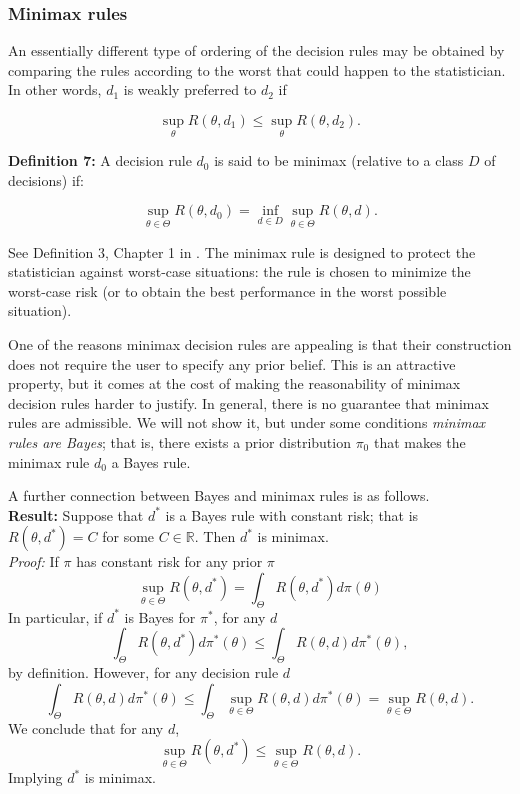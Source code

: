 \documentclass[11pt]{article} %
\begin{document}
\subsubsection{Minimax rules} 

An essentially different type of ordering of the decision rules may be obtained by comparing the rules according to the worst that could happen to the statistician. In other words, $d_1$ is weakly preferred to $d_2$ if

\[ \sup_{\theta} R(\theta, d_1) \leq \sup_{\theta} R(\theta, d_2). \]

\noindent \textbf{Definition 7:} A decision rule $d_0$ is said to be minimax (relative to a class $D$ of decisions) if:

\[ \sup_{\theta \in \Theta} R(\theta, d_0) = \inf_{d \in D} \sup_{\theta \in \Theta} R(\theta, d). \] 

See Definition 3, Chapter 1 in \cite{Ferguson67}. The minimax rule is designed to protect the statistician against worst-case situations: the rule is chosen to minimize the worst-case risk (or to obtain the best performance in the worst possible situation). 

One of the reasons minimax decision rules are appealing is that their construction does not require the user to specify any prior belief. This is an attractive property, but it comes at the cost of making the reasonability of minimax decision rules harder to justify. In general, there is no guarantee that minimax rules are admissible. We will not show it, but under some conditions \emph{minimax rules are Bayes}; that is, there exists a prior distribution $\pi_0$ that makes the minimax rule $d_0$ a Bayes rule. 

A further connection between Bayes and minimax rules is as follows. \\

\noindent \textbf{Result:} Suppose that $d^*$ is a Bayes rule with constant risk; that is $R(\theta, d^*)= C$ for some $C \in \mathbb{R}$. Then $d^*$ is minimax. \\

\noindent \emph{Proof:} If $\pi$ has constant risk for any prior $\pi$
\[ \sup_{\theta \in \Theta} R(\theta, d^*) = \int_{\Theta} R(\theta, d^*) d \pi(\theta)   \]
 In particular, if $d^*$ is Bayes for $\pi^*$, for any $d$
 \[  \int_{\Theta} R(\theta, d^*) d \pi^*(\theta) \leq \int_{\Theta} R(\theta, d) d \pi^*(\theta),    \]
by definition. However, for any decision rule $d$
 \[  \int_{\Theta} R(\theta, d) d \pi^*(\theta) \leq \int_{\Theta} \sup_{\theta \in \Theta} R(\theta, d) d \pi^*(\theta) = \sup_{\theta \in \Theta} R(\theta,d).    \]
 We conclude that for any $d$,
 \[\sup_{\theta \in \Theta} R(\theta, d^*) \leq  \sup_{\theta \in \Theta} R(\theta,d).  \]
Implying $d^*$ is minimax. 
\end{document}

